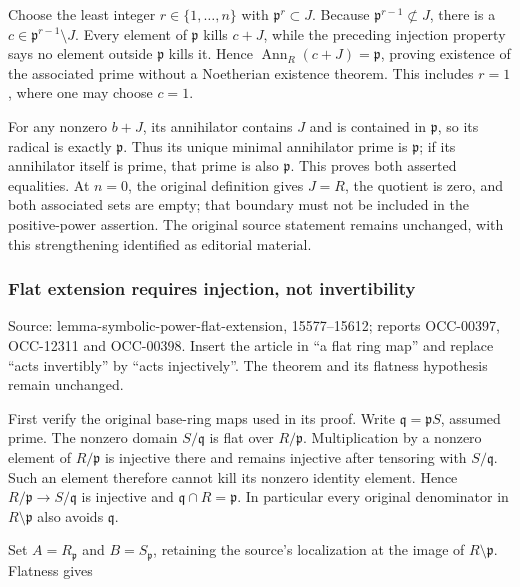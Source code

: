 Choose the least integer \(r\in\{1,\ldots,n\}\) with \(\mathfrak p^r\subset J\). Because \(\mathfrak p^{r-1}\not\subset J\), there is a \(c\in\mathfrak p^{r-1}\setminus J\). Every element of \(\mathfrak p\) kills \(c+J\), while the preceding injection property says no element outside \(\mathfrak p\) kills it. Hence \(\operatorname{Ann}_R(c+J)=\mathfrak p\), proving existence of the associated prime without a Noetherian existence theorem. This includes \(r=1\), where one may choose \(c=1\).

For any nonzero \(b+J\), its annihilator contains \(J\) and is contained in \(\mathfrak p\), so its radical is exactly \(\mathfrak p\). Thus its unique minimal annihilator prime is \(\mathfrak p\); if its annihilator itself is prime, that prime is also \(\mathfrak p\). This proves both asserted equalities. At \(n=0\), the original definition gives \(J=R\), the quotient is zero, and both associated sets are empty; that boundary must not be included in the positive-power assertion. The original source statement remains unchanged, with this strengthening identified as editorial material.

\subsubsection{Flat extension requires injection, not invertibility}\label{algebra-proof-005-flat-extension-requires-injection-not-invertibility}

Source: lemma-\AlgebraIdentifierBreak{}symbolic-\AlgebraIdentifierBreak{}power-\AlgebraIdentifierBreak{}flat-\AlgebraIdentifierBreak{}extension, 15577--15612; reports OCC-00397, OCC-12311 and OCC-00398. Insert the article in ``a flat ring map'' and replace ``acts invertibly'' by ``acts injectively''. The theorem and its flatness hypothesis remain unchanged.

First verify the original base-ring maps used in its proof. Write \(\mathfrak q=\mathfrak pS\), assumed prime. The nonzero domain \(S/\mathfrak q\) is flat over \(R/\mathfrak p\). Multiplication by a nonzero element of \(R/\mathfrak p\) is injective there and remains injective after tensoring with \(S/\mathfrak q\). Such an element therefore cannot kill its nonzero identity element. Hence \(R/\mathfrak p\to S/\mathfrak q\) is injective and \(\mathfrak q\cap R=\mathfrak p\). In particular every original denominator in \(R\setminus\mathfrak p\) also avoids \(\mathfrak q\).

Set \(A=R_{\mathfrak p}\) and \(B=S_{\mathfrak p}\), retaining the source's localization at the image of \(R\setminus\mathfrak p\). Flatness gives

